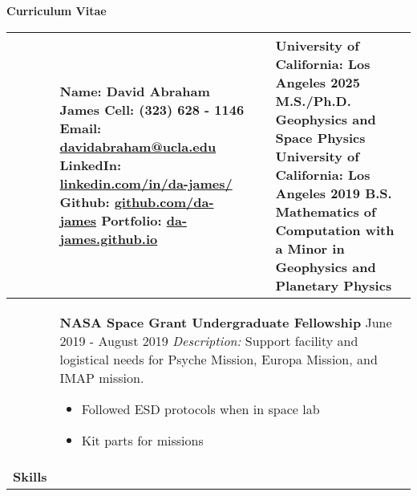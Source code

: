 \documentclass[10pt]{article}
\newcommand*\leftright[2]{%
  \leavevmode
  \rlap{#1}%
  \hspace{0.5\linewidth}%
  #2}
\begin{document}
{\centering
    \textbf{\large Curriculum Vitae} \\
}
\begin{longtable}{l l l l} \hline
    \multicolumn{1}{p{1.7 cm}}{\textbf{\vspace{Contact Info.}}}    &    
    
        \multicolumn{1}{p{7cm}}{
        \textbf{Name:} David Abraham James \newline
        \textbf{Cell: } (323) 628 - 1146 \newline
        \textbf{Email: } \href{mailto:davidabraham@ucla.edu}{davidabraham@ucla.edu} \newline
        \textbf{LinkedIn: } \href{https://www.linkedin.com/in/da-james/}{linkedin.com/in/da-james/} \newline
        \textbf{Github: } \href{https://github.com/da-james}{github.com/da-james} \newline
        \textbf{Portfolio: } \href{https://da-james.github.io}{da-james.github.io}} &
        \multicolumn{1}{p{1.5cm}}{\textbf{\vspace{Education}}}  &
            \multicolumn{1}{p{7.4cm}}{
            \textbf{University of California: Los Angeles 2025} \newline
            M.S./Ph.D. Geophysics and Space Physics \newline
            \textbf{University of California: Los Angeles 2019} \newline
            B.S. Mathematics of Computation  with a \newline
            Minor in Geophysics and Planetary Physics} \\ \hline

    \multicolumn{1}{p{1.7cm}}{
    \textbf{\vspace{Awards}}}    &                
    
        \multicolumn{3}{p{17cm}}{
        \textbf{NASA Space Grant Undergraduate Fellowship} \newline
        \leftright{\textit{Lab Assistant}}{June 2019 - August 2019} \newline
        \textit{Description:} Support facility and logistical needs for Psyche Mission, Europa Mission, and IMAP mission.
        \begin{itemize}[noitemsep,nolistsep]
            \item Followed ESD protocols when in space lab
            \item Kit parts for missions
        \end{itemize}
       \baselineskip } \\ \hline
    \multicolumn{1}{p{1.7cm}}{\textbf{Skills}}   &
    

\end{longtable}
\end{document}
